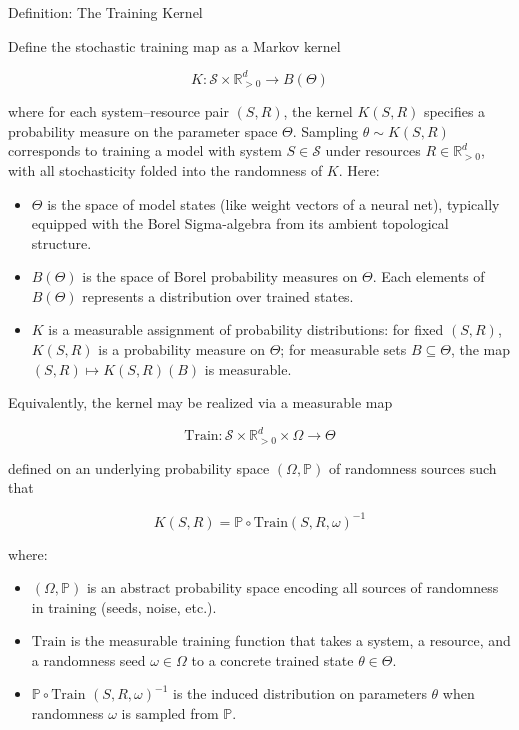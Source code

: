 \documentclass[12pt]{article}
\begin{document}
\begin{statementbox}{Definition: The Training Kernel}

Define the stochastic training map as a Markov kernel

\[
K :\mathcal S \times \mathbb R^d_{>0} \longrightarrow B(\Theta)
\]

where for each system–resource pair $(S,R)$, the kernel $K(S,R)$ specifies a probability measure on the parameter space $\Theta$. Sampling $\theta\sim K(S,R)$ corresponds to training a model with system $S\in \mathcal S$ under resources $R\in \mathbb R^d_{>0}$, with all stochasticity folded into the randomness of $K$. Here:

\begin{itemize}
    \item $\Theta$ is the space of model states (like weight vectors of a neural net), typically equipped with the Borel Sigma-algebra from its ambient topological structure.
    \item $B(\Theta)$ is the space of Borel probability measures on $\Theta$. Each elements of $B(\Theta)$ represents a distribution over trained states.
    \item $K$ is a measurable assignment of probability distributions: for fixed $(S,R)$, $K(S,R)$ is a probability measure on $\Theta$; for measurable sets $B \subseteq \Theta$, the map $(S,R)\mapsto K(S,R)(B)$ is measurable.
\end{itemize}

\end{statementbox}

Equivalently, the kernel may be realized via a measurable map

\[
\text{Train}:\mathcal S \times \mathbb R^d_{>0} \times \Omega\longrightarrow \Theta
\]

defined on an underlying probability space $(\Omega, \mathbb P)$ of randomness sources such that

\[
K(S,R)=\mathbb P \circ \text{Train}(S,R,\omega)^{-1}
\]

where:
\begin{itemize}
    \item $(\Omega,\mathbb P)$ is an abstract probability space encoding all sources of randomness in training (seeds, noise, etc.).
    \item $\text{Train}$ is the measurable training function that takes a system, a resource, and a randomness seed $\omega\in \Omega$ to a concrete trained state $\theta\in \Theta$.
    \item $\mathbb P \circ \text{Train }(S,R,\omega)^{-1}$ is the induced distribution on parameters $\theta$ when randomness $\omega$ is sampled from $\mathbb P$.
\end{itemize}
\end{document}

